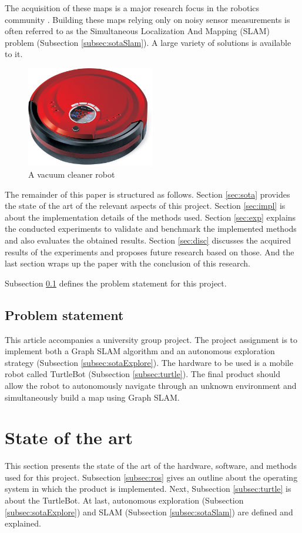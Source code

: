 \documentclass{ba-kecs}
\begin{document}
The acquisition of these maps is a major research focus in the robotics community \cite{ Grisetti, Montemerlo02, Montemerlo, Thrun}. Building these maps relying only on noisy sensor measurements is often referred to as the Simultaneous Localization And Mapping (SLAM) problem (Subsection \ref{subsec:sotaSlam}). A large variety of solutions is available to it.
\begin{figure}[h]
	\centering
		\includegraphics[width=0.50\textwidth]{figures/vacuum_cleaner.jpg}
	\caption{A vacuum cleaner robot \citep{VacuumRobot}}
	\label{fig:vacuum_cleaner}
\end{figure}

The remainder of this paper is structured as follows. Section \ref{sec:sota} provides the state of the art of the relevant aspects of this project. Section \ref{sec:impl} is about the implementation details of the methods used. Section \ref{sec:exp} explains the conducted experiments to validate and benchmark the implemented methods and also evaluates the obtained results. Section \ref{sec:disc} discusses the acquired results of the experiments and proposes future research based on those. And the last section wraps up the paper with the conclusion of this research.

Subsection \ref{sec:problem} defines the problem statement for this project.
\subsection{Problem statement}
\label{sec:problem}
This article accompanies a university group project. The project assignment is to implement both a Graph SLAM algorithm and an autonomous exploration strategy (Subsection \ref{subsec:sotaExplore}). The hardware to be used is a mobile robot called TurtleBot (Subsection \ref{subsec:turtle}). The final product should allow the robot to autonomously navigate through an unknown environment and simultaneously build a map using Graph SLAM.

\section{State of the art}
This section presents the state of the art of the hardware, software, and methods used for this project. Subsection \ref{subsec:ros} gives an outline about the operating system in which the product is implemented. Next, Subsection \ref{subsec:turtle} is about the TurtleBot. At last, autonomous exploration (Subsection \ref{subsec:sotaExplore}) and SLAM (Subsection \ref{subsec:sotaSlam}) 
\label{sec:sota} are defined and explained.
\end{document}
